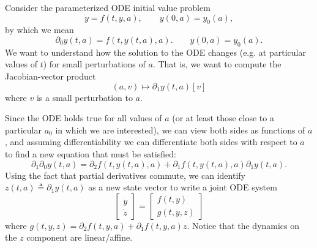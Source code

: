 \documentclass{article}
\begin{document}
Consider the parameterized ODE initial value problem
\begin{equation}
    \dot y = f(t, y, a), \qquad y(0, a) = y_0(a),
\end{equation}
by which we mean
\begin{equation}
    \partial_0 y(t, a) = f(t, y(t, a), a). \qquad y(0, a) = y_0(a).
\end{equation}
We want to understand how the solution to the ODE changes (e.g. at particular
values of $t$) for small perturbations of $a$. That is, we want to compute the
Jacobian-vector product
\begin{equation}
    (a, v) \mapsto \partial_1 y(t, a)[v]
\end{equation}
where $v$ is a small perturbation to $a$.

Since the ODE holds true for all values of $a$ (or at least those close to a
particular $a_0$ in which we are interested), we can view both sides as
functions of $a$, and assuming differentiability we can differentiate both
sides with respect to $a$ to find a new equation that must be satisfied:
\begin{equation}
    \partial_1 \partial_0 y(t, a) = \partial_2 f(t, y(t, a), a) + \partial_1 f(t, y(t, a), a) \partial_1 y(t, a).
\end{equation}
Using the fact that partial derivatives commute, we can identify $z(t, a)
\triangleq \partial_1 y(t, a)$ as a new state vector to write a joint ODE system
\begin{equation}
    \begin{bmatrix}
        \dot y \\
        \dot z
    \end{bmatrix}
    =
    \begin{bmatrix}
        f(t, y) \\
        g(t, y, z)
    \end{bmatrix}
\end{equation}
where $g(t, y, z) = \partial_2 f(t, y, a) + \partial_1 f(t, y, a) z$. Notice
that the dynamics on the $z$ component are linear/affine.
\end{document}
